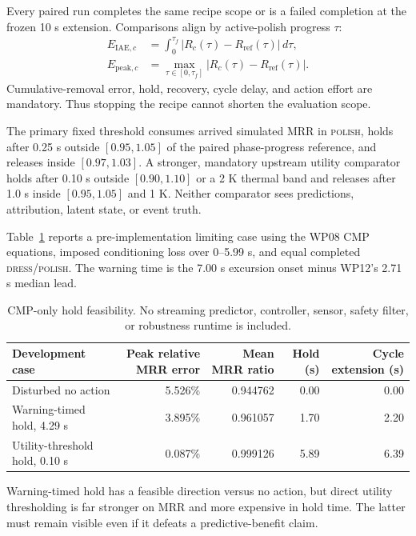 \documentclass[10pt,twocolumn]{article}
\begin{document}
Every paired run completes the same recipe scope or is a failed completion at
the frozen 10 s extension. Comparisons align by active-polish progress $\tau$:
\begin{align}
E_{\mathrm{IAE},c}&=\int_0^{\tau_f}
|R_c(\tau)-R_{\mathrm{ref}}(\tau)|\,d\tau,\\
E_{\mathrm{peak},c}&=\max_{\tau\in[0,\tau_f]}
|R_c(\tau)-R_{\mathrm{ref}}(\tau)|.\label{eq:control-errors}
\end{align}
Cumulative-removal error, hold, recovery, cycle delay, and action effort are
mandatory. Thus stopping the recipe cannot shorten the evaluation scope.

The primary fixed threshold consumes arrived simulated MRR in
\textsc{polish}, holds after 0.25 s outside $[0.95,1.05]$ of the paired
phase-progress reference, and releases inside $[0.97,1.03]$. A stronger,
mandatory upstream utility comparator holds after 0.10 s outside
$[0.90,1.10]$ or a 2 K thermal band and releases after 1.0 s inside
$[0.95,1.05]$ and 1 K. Neither comparator sees predictions, attribution,
latent state, or event truth.

Table~\ref{tab:hold-feasibility} reports a pre-implementation limiting case
using the WP08 CMP equations, imposed conditioning loss over 0--5.99 s, and
equal completed \textsc{dress}/\textsc{polish}. The warning time is the 7.00 s
excursion onset minus WP12's 2.71 s median lead.

\begin{table}[t]
\centering
\caption{CMP-only hold feasibility. No streaming predictor, controller,
sensor, safety filter, or robustness runtime is included.}
\label{tab:hold-feasibility}
\small
\begin{tabular}{lrrrr}
\toprule
Development case & Peak relative MRR error & Mean MRR ratio & Hold (s) &
Cycle extension (s)\\
\midrule
Disturbed no action & 5.526\% & 0.944762 & 0.00 & 0.00\\
Warning-timed hold, 4.29 s & 3.895\% & 0.961057 & 1.70 & 2.20\\
Utility-threshold hold, 0.10 s & 0.087\% & 0.999126 & 5.89 & 6.39\\
\bottomrule
\end{tabular}
\end{table}

Warning-timed hold has a feasible direction versus no action, but direct
utility thresholding is far stronger on MRR and more expensive in hold time.
The latter must remain visible even if it defeats a predictive-benefit claim.
\end{document}
